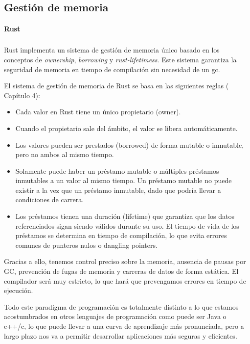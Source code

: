 \subsection{Gestión de memoria}
\paragraph{Rust}
\subparagraph{}

Rust implementa un sistema de gestión de memoria único basado en los conceptos de \textit{ownership}, \textit{borrowing} y \textit{\glspl{rust-lifetimes}}. Este sistema garantiza la seguridad de memoria en tiempo de compilación sin necesidad de un \acrfull{gc}.

El sistema de gestión de memoria de Rust se basa en las siguientes reglas (\cite{rustbook2024} Capítulo 4):
\begin{itemize}
    \item Cada valor en Rust tiene un único propietario (owner).
    \item Cuando el propietario sale del ámbito, el valor se libera automáticamente.
    \item Los valores pueden ser prestados (borrowed) de forma mutable o inmutable, pero no ambos al mismo tiempo.
    \item Solamente puede haber un préstamo mutable o múltiples préstamos inmutables a un valor al mismo tiempo. Un préstamo mutable no puede existir a la vez que un préstamo inmutable, dado que podría llevar a condiciones de carrera.
    \item Los préstamos tienen una duración (lifetime) que garantiza que los datos referenciados sigan siendo válidos durante su uso. El tiempo de vida de los préstamos se determina en tiempo de compilación, lo que evita errores comunes de punteros nulos o dangling pointers.
\end{itemize}

Gracias a ello, tenemos control preciso sobre la memoria, ausencia de pausas por GC, prevención de fugas de memoria y carreras de datos de forma estática. El compilador será muy estricto, lo que hará que prevengamos errores en tiempo de ejecución.

Todo este paradigma de programación es totalmente distinto a lo que estamos acostumbrados en otros lenguajes de programación como puede ser Java o c++/c, lo que puede llevar a una curva de aprendizaje más pronunciada, pero a largo plazo nos va a permitir desarrollar aplicaciones más seguras y eficientes.

